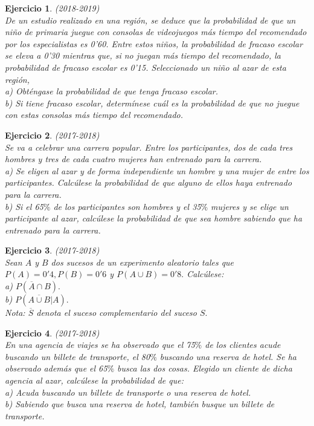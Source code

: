 \documentclass[12pt, a4paper]{amsart}
\newtheorem{ejer}{Ejercicio}
\begin{document}
\begin{ejer}\em (2018-2019)\\
De un estudio realizado en una región, se deduce que la probabilidad de que un niño de primaria juegue con
consolas de videojuegos más tiempo del recomendado por los especialistas es 0'60. Entre estos niños, la
probabilidad de fracaso escolar se eleva a 0'30 mientras que, si no juegan más tiempo del recomendado, la
probabilidad de fracaso escolar es 0'15. Seleccionado un niño al azar de esta región,\\
a) Obténgase la probabilidad de que tenga fracaso escolar.\\
b) Si tiene fracaso escolar, determínese cuál es la probabilidad de que no juegue con estas consolas más tiempo
del recomendado.
\end{ejer}

\begin{ejer}\em (2017-2018)\\
Se va a celebrar una carrera popular. Entre los participantes, dos de cada tres hombres y tres de cada cuatro
mujeres han entrenado para la carrera.\\
a) Se eligen al azar y de forma independiente un hombre y una mujer de entre los participantes. Calcúlese la
probabilidad de que alguno de ellos haya entrenado para la carrera.\\
b) Si el 65$\%$ de los participantes son hombres y el 35$\%$ mujeres y se elige un participante al azar, calcúlese la
probabilidad de que sea hombre sabiendo que ha entrenado para la carrera.
\end{ejer}

\begin{ejer}\em (2017-2018)\\
Sean $A$ y $B$ dos sucesos de un experimento aleatorio tales que $P(A) = 0'4, P(B) = 0'6$ y $P(A \cup B) = 0'8.$
Calcúlese:\\
a) $P(\overline{A} \cap B).$\\
b) $P(\overline{A \cup B} | A).$\\
Nota: $\overline{S}$ denota el suceso complementario del suceso $S.$
\end{ejer}

\begin{ejer}\em (2017-2018)\\
En una agencia de viajes se ha observado que el 75$\%$ de los clientes acude buscando un billete de transporte,
el 80$\%$ buscando una reserva de hotel. Se ha observado además que el 65$\%$ busca las dos cosas. Elegido un
cliente de dicha agencia al azar, calcúlese la probabilidad de que:\\
a) Acuda buscando un billete de transporte o una reserva de hotel.\\
b) Sabiendo que busca una reserva de hotel, también busque un billete de transporte.
\end{ejer}
\end{document}
